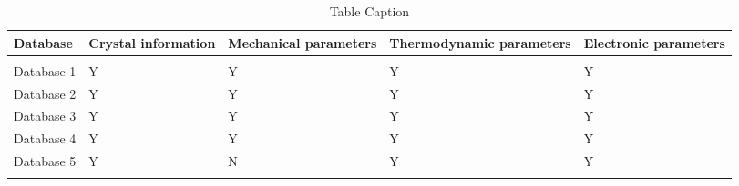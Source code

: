 \justify
\skipspace
\begin{table} [!ht]
    \centering
    \caption{Table Caption}
    \begin{tabular}[h]{p{3cm}p{2cm}p{2cm}p{3cm}p{2cm}}
        \hline
        Database   & Crystal information & Mechanical parameters & Thermodynamic parameters & Electronic parameters \\
        \hline \hline
        \\
        Database 1 & Y                   & Y                     & Y                        & Y                     \\
        Database 2 & Y                   & Y                     & Y                        & Y                     \\
        Database 3 & Y                   & Y                     & Y                        & Y                     \\
        Database 4 & Y                   & Y                     & Y                        & Y                     \\
        Database 5 & Y                   & N                     & Y                        & Y                     \\
                   &                     &                                                                          \\
    \end{tabular}
    \label{tab:week1}
    \label{tab:temps}
\end{table}
\newpage

